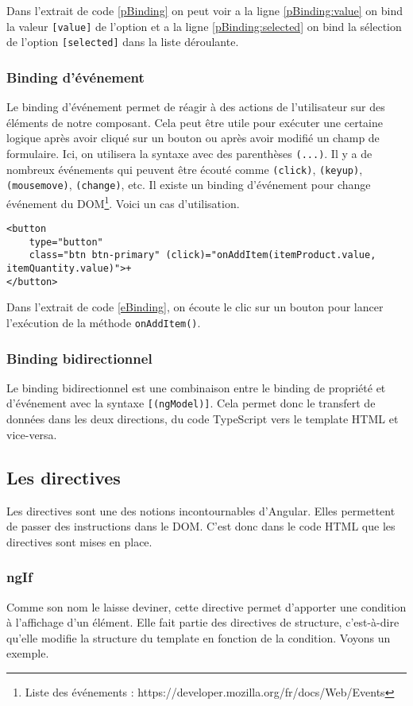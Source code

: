 Dans l'extrait de code \ref{pBinding} on peut voir a la ligne \ref{pBinding:value} on bind la valeur \texttt{[value]} de l'option et a la ligne \ref{pBinding:selected} on bind la sélection de l'option \texttt{[selected]} dans la liste déroulante.

\subsubsection{Binding d'événement}
Le binding d'événement permet de réagir à des actions de l'utilisateur sur des éléments de notre composant. Cela peut être utile pour exécuter une certaine logique après avoir cliqué sur un bouton ou après avoir modifié un champ de formulaire. Ici, on utilisera la syntaxe avec des parenthèses \texttt{(...)}. Il y a de nombreux événements qui peuvent être écouté comme \texttt{(click)}, \texttt{(keyup)}, \texttt{(mousemove)}, \texttt{(change)}, etc. Il existe un binding d'événement pour change événement du DOM\footnote{Liste des événements : https://developer.mozilla.org/fr/docs/Web/Events}. Voici un cas d'utilisation.

\begin{lstlisting}[style=htmlcssjs, caption={Binding d'événement}, label=eBinding]
<button
	type="button"
	class="btn btn-primary" (click)="onAddItem(itemProduct.value, itemQuantity.value)">+
</button>
\end{lstlisting}

Dans l'extrait de code \ref{eBinding}, on écoute le clic sur un bouton pour lancer l'exécution de la méthode \texttt{onAddItem()}.

\subsubsection{Binding bidirectionnel}
Le binding bidirectionnel est une combinaison entre le binding de propriété et d'événement avec la syntaxe \texttt{[(ngModel)]}. Cela permet donc le transfert de données dans les deux directions, du code TypeScript vers le template HTML et vice-versa.

\subsection{Les directives}
Les directives sont une des notions incontournables d'Angular. Elles permettent de passer des instructions dans le DOM. C'est donc dans le code HTML que les directives sont mises en place. 
\subsubsection{ngIf}
Comme son nom le laisse deviner, cette directive permet d'apporter une condition à l'affichage d'un élément. Elle fait partie des directives de structure, c'est-à-dire qu'elle modifie la structure du template en fonction de la condition. Voyons un exemple.

